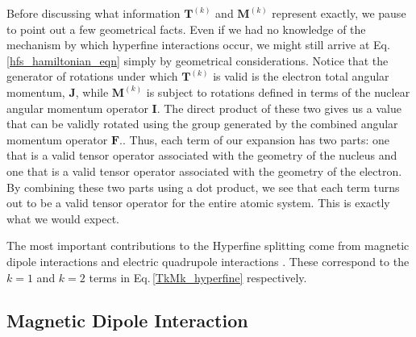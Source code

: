 Before discussing what information $\mathbf{T}^{(k)}$ and $\mathbf{M}^{(k)}$ represent exactly,
we pause to point out a few geometrical facts. Even if we had no knowledge of the mechanism by which hyperfine interactions occur, we might still arrive at Eq.\,\ref{hfs_hamiltonian_eqn} simply by geometrical considerations.
Notice that the generator of rotations under which $\mathbf{T}^{(k)}$ is valid is the electron total angular momentum, $\mathbf{J}$, while $\mathbf{M}^{(k)}$ is subject to rotations defined in terms of the nuclear angular momentum operator $\mathbf{I}$. 
The direct product of these two gives us a value that can be validly rotated using the group generated by the combined angular momentum operator $\mathbf{F}$.\cite{Racah2}\cite{sobelman_spectra}. Thus, each term of our expansion has two parts: one that is a valid tensor operator associated with the geometry of the nucleus and one that is a valid tensor operator associated with the geometry of the electron. By combining these two parts using a dot product, we see that each term turns out to be a valid tensor operator for the entire atomic system. This is exactly what we would expect.

The most important contributions to the Hyperfine splitting come from magnetic dipole interactions and electric quadrupole interactions \cite{sobelman_spectra}\cite{schwartz_hyperfine_expansion}\cite{cuaMITnotes}. These correspond to the $k=1$ and $k=2$ terms in Eq.\,\ref{TkMk_hyperfine} respectively\cite{experimental_hyperfine_alkali_arimondo}.
\subsection{Magnetic Dipole Interaction}

